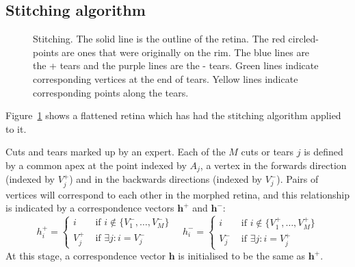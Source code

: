 \documentclass{article}
\renewcommand{\vec}[1]{\mathbf{#1}}
\begin{document}
\subsection{Stitching algorithm}
\label{fold-sphere:sec:stitching-algorithm}

\begin{figure}[tp]
  \centering
  \caption{Stitching. The solid line is the outline of the retina. The
    red circled-points are ones that were originally on the rim. The
    blue lines are the + tears and the purple lines are the - tears.
    Green lines indicate corresponding vertices at the end of tears.
    Yellow lines indicate corresponding points along the tears. }
  \label{fold-sphere:fig:stitch}
\end{figure}

Figure~\ref{fold-sphere:fig:stitch} shows a flattened
retina which has had the stitching algorithm applied to it. 

Cuts and tears marked up by an expert.  Each of the $M$ cuts or tears
$j$ is defined by a common apex at the point indexed by $A_j$, a
vertex in the forwards direction (indexed by $V^+_j$) and in the
backwards directions (indexed by $V^-_j$).  Pairs of vertices will
correspond to each other in the morphed retina, and this relationship
is indicated by a correspondence vectors $\vec{h}^+$ and $\vec{h}^-$:
\begin{displaymath}
  h^+_i =  \left\{
    \begin{array}{ll}
      i & \mbox{ if } i \not\in \{V^-_1,\dots, V^-_M\} \\
      V^+_j  & \mbox{ if } \exists j: i = V^-_j
    \end{array}\right.
  \quad
  h^-_i =  \left\{
    \begin{array}{ll}
      i & \mbox{ if } i \not\in \{V^+_1,\dots, V^+_M\} \\
      V^-_j  & \mbox{ if } \exists j: i = V^+_j
    \end{array}\right.
\end{displaymath}
At this stage, a correspondence vector $\vec{h}$ is initialised to be
the same as $\vec{h}^+$.
\end{document}
